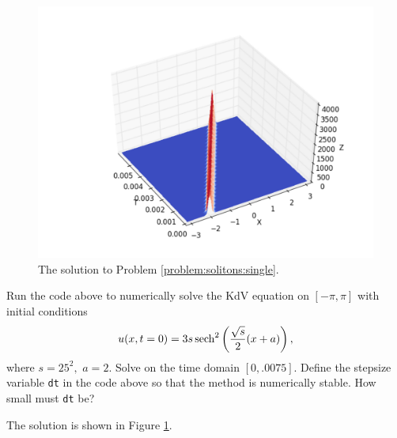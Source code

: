 % 
% 
% 
% 
\begin{figure}
\centering
\includegraphics[width=\textwidth]{soliton.pdf}
\caption{The solution to Problem \ref{problem:solitons:single}.}
\label{fig:solitons:single}
\end{figure}


\begin{problem}
Run the code above to numerically solve the KdV equation on $[-\pi,\pi]$ with initial conditions 
\[
u(x,t=0) = 3s\operatorname{sech}^2\left(\frac{\sqrt{s}}{2}(x+a)\right),
\]
where $s = 25^2,$ $a = 2$. Solve on the time domain $[0,.0075]$. Define the stepsize variable {\tt dt} in the code above so that the method is numerically stable.  How small must {\tt dt} be? 

The solution is shown in Figure \ref{fig:solitons:single}.
\label{problem:solitons:single}
\end{problem}


